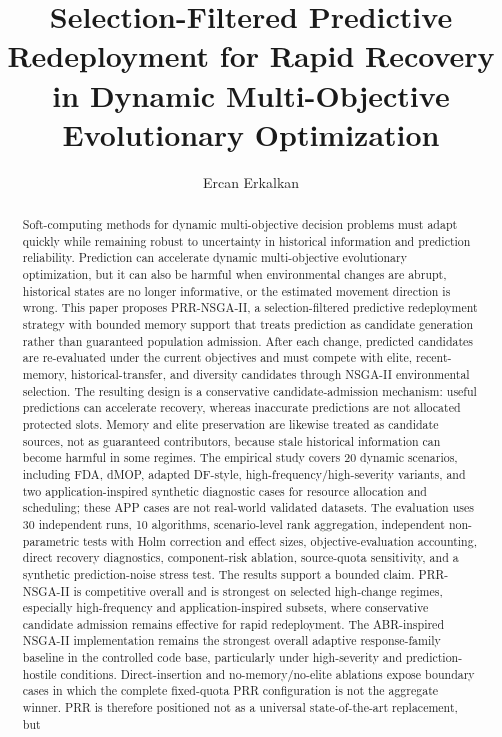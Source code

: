 \documentclass[1p,times]{elsarticle}
\begin{document}
\begin{frontmatter}

\title{Selection-Filtered Predictive Redeployment for Rapid Recovery in Dynamic Multi-Objective Evolutionary Optimization}

\author[aff1]{Ercan Erkalkan}



\begin{abstract}
Soft-computing methods for dynamic multi-objective decision problems must adapt quickly while remaining robust to uncertainty in historical information and prediction reliability. Prediction can accelerate dynamic multi-objective evolutionary optimization, but it can also be harmful when environmental changes are abrupt, historical states are no longer informative, or the estimated movement direction is wrong. This paper proposes PRR-NSGA-II, a selection-filtered predictive redeployment strategy with bounded memory support that treats prediction as candidate generation rather than guaranteed population admission. After each change, predicted candidates are re-evaluated under the current objectives and must compete with elite, recent-memory, historical-transfer, and diversity candidates through NSGA-II environmental selection. The resulting design is a conservative candidate-admission mechanism: useful predictions can accelerate recovery, whereas inaccurate predictions are not allocated protected slots. Memory and elite preservation are likewise treated as candidate sources, not as guaranteed contributors, because stale historical information can become harmful in some regimes. The empirical study covers 20 dynamic scenarios, including FDA, dMOP, adapted DF-style, high-frequency/high-severity variants, and two application-inspired synthetic diagnostic cases for resource allocation and scheduling; these APP cases are not real-world validated datasets. The evaluation uses 30 independent runs, 10 algorithms, scenario-level rank aggregation, independent non-parametric tests with Holm correction and effect sizes, objective-evaluation accounting, direct recovery diagnostics, component-risk ablation, source-quota sensitivity, and a synthetic prediction-noise stress test. The results support a bounded claim. PRR-NSGA-II is competitive overall and is strongest on selected high-change regimes, especially high-frequency and application-inspired subsets, where conservative candidate admission remains effective for rapid redeployment. The ABR-inspired NSGA-II implementation remains the strongest overall adaptive response-family baseline in the controlled code base, particularly under high-severity and prediction-hostile conditions. Direct-insertion and no-memory/no-elite ablations expose boundary cases in which the complete fixed-quota PRR configuration is not the aggregate winner. PRR is therefore positioned not as a universal state-of-the-art replacement, but 
\end{abstract}
\end{frontmatter}
\end{document}

